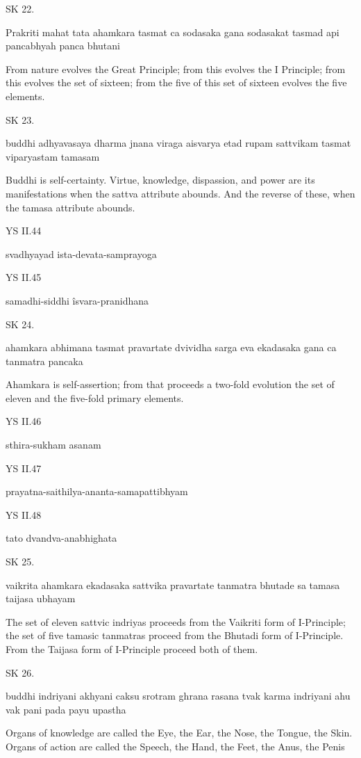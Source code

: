 SK 22.

Prakriti mahat tata ahamkara tasmat ca sodasaka gana
sodasakat tasmad api pancabhyah panca bhutani

From nature evolves the Great Principle;
from this evolves the I Principle;
from this evolves the set of sixteen;
from the five of this set of sixteen evolves the five elements.

SK 23.

buddhi adhyavasaya dharma jnana viraga aisvarya
etad rupam sattvikam tasmat viparyastam tamasam

Buddhi is self-certainty.
Virtue, knowledge, dispassion, and power are its manifestations
when the sattva attribute abounds.
And the reverse of these, when the tamasa attribute abounds.

YS II.44

    svadhyayad ista-devata-samprayoga

YS II.45

    samadhi-siddhi îsvara-pranidhana

SK 24.

ahamkara abhimana tasmat pravartate dvividha sarga eva
ekadasaka gana ca tanmatra pancaka

Ahamkara is self-assertion;
from that proceeds a two-fold evolution
the set of eleven and the five-fold primary elements.

YS II.46

    sthira-sukham asanam

YS II.47

    prayatna-saithilya-ananta-samapattibhyam

YS II.48

    tato dvandva-anabhighata

SK 25.

vaikrita ahamkara ekadasaka sattvika pravartate
tanmatra bhutade sa tamasa taijasa ubhayam

The set of eleven sattvic indriyas proceeds from
the Vaikriti form of I-Principle;
the set of five tamasic tanmatras proceed from
the Bhutadi form of I-Principle.
From the Taijasa form of I-Principle proceed both of them.

SK 26.

buddhi indriyani akhyani caksu srotram ghrana rasana tvak
karma indriyani ahu vak pani pada payu upastha

Organs of knowledge are called
the Eye, the Ear, the Nose, the Tongue, the Skin.
Organs of action are called
the Speech, the Hand, the Feet, the Anus, the Penis

